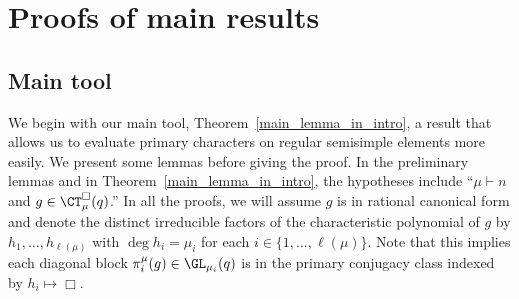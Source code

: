 \section{Proofs of main results}
\label{main_results_section}


































\subsection{Main tool} \label{reg_ss}

We begin with our main tool, Theorem~\ref{main_lemma_in_intro}, a result that allows us to evaluate primary characters on regular semisimple elements more easily.
We present some lemmas before giving the proof.
In the preliminary lemmas and in Theorem~\ref{main_lemma_in_intro}, the hypotheses include ``\(\mu \vdash n\) and \(g \in \CT_\mu^\Box (q)\).''
In all the proofs, we will assume \(g\) is in rational canonical form and denote the distinct irreducible factors of the characteristic polynomial of \(g\) by \(h_1,\ldots,h_{\ell(\mu)}\) with \(\deg h_i = \mu_i\) for each \(i \in \{1,\ldots,\ell(\mu)\}\).
Note that this implies each diagonal block \(\pi_i^\mu (g) \in \GL_{\mu_i} (q)\) is in the primary conjugacy class indexed by \(h_i \mapsto \Box\).



